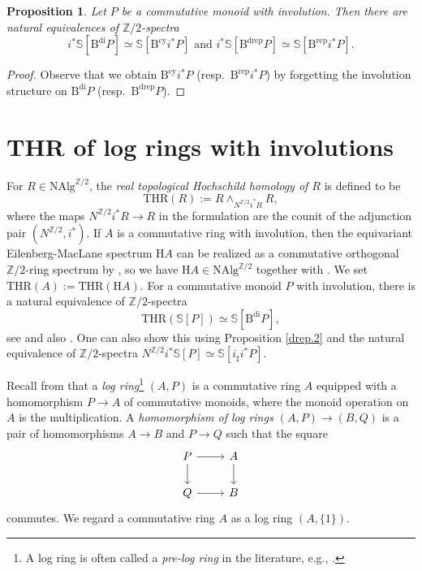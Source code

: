 \documentclass[10pt]{amsart}
\newtheorem{prop}[thm]{Proposition}
\theoremstyle{definition}
\theoremstyle{remark}
\numberwithin{equation}{section}
\newcommand{\Sphere}{\mathbb{S}}
\newcommand{\Z}{\mathbb{Z}}
\newcommand{\NAlg}{\mathrm{NAlg}}
\newcommand{\EM}{\mathrm{H}}
\newcommand{\Bcy}{\mathrm{B}^\mathrm{cy}}
\newcommand{\Brep}{\mathrm{B}^\mathrm{rep}}
\newcommand{\Bdi}{\mathrm{B}^{\mathrm{di}}}
\newcommand{\Bdrep}{\mathrm{B}^\mathrm{drep}}
\newcommand{\THR}{\mathrm{THR}}
\newcommand{\Ztwo}{{\mathbb{Z}/2}}
\begin{document}
\begin{prop}
\label{drep.3}
Let $P$ be a commutative monoid with involution.
Then there are natural equivalences of $\Ztwo$-spectra
\[
i^*\Sphere[\Bdi P]
\simeq
\Sphere[\Bcy i^*P]
\text{ and }
i^*\Sphere[\Bdrep P]
\simeq
\Sphere[\Brep i^*P].
\]
\end{prop}
\begin{proof}
Observe that we obtain $\Bcy i^*P$ (resp.\ $\Brep i^*P$) by forgetting the involution structure on $\Bdi P$ (resp.\ $\Bdrep P$).
\end{proof}


\section{THR of log rings with involutions}
\label{thrring}




For $R\in \NAlg^{\Ztwo}$,
the \emph{real topological Hochschild homology of $R$} is defined to be
\[
\THR(R)
:=
R\wedge_{N^{\Ztwo}i^*R}R,
\]
where the maps $N^{\Ztwo}i^*R \to R$ in the formulation are the counit of the adjunction pair $(N^{\Ztwo},i^*)$.
If $A$ is a commutative ring with involution,
then
the equivariant Eilenberg-MacLane spectrum $\EM A$ can be realized as a commutative orthogonal $\Z/2$-ring spectrum by \cite[Example 11.12]{Schwede},
so we have $\EM A\in \NAlg^{\Z/2}$ together with \cite[Remark A.2.3]{THR}.
We set $\THR(A):=\THR(\EM A)$.
For a commutative monoid $P$ with involution,
there is a natural equivalence of $\Ztwo$-spectra
\begin{equation}
\THR(\Sphere[P])
\simeq
\Sphere[\Bdi P],
\end{equation}
see \cite{Hog} and also  \cite[Proposition 5.9]{DMPR21}.
One can also show this using Proposition \ref{drep.2} and the natural equivalence of $\Ztwo$-spectra $N^{\Ztwo} i^*\Sphere[P]\simeq \Sphere[i_\sharp i^*P]$.

Recall from \cite[Definition III.1.2.3]{Ogu} that a \emph{log ring}\footnote{A log ring is often called a \emph{pre-log ring} in the literature, e.g.,  \cite[Definition 2.1]{Rog09}.}  $(A,P)$ is a commutative ring $A$ equipped with a homomorphism $P\to A$ of commutative monoids,
where the monoid operation on $A$ is the multiplication.
A \emph{homomorphism of log rings $(A,P)\to (B,Q)$} is a pair of homomorphisms $A\to B$ and $P\to Q$ such that the square
\[
\begin{tikzcd}
P\ar[d]\ar[r]&
A\ar[d]
\\
Q\ar[r]&
B
\end{tikzcd}
\]
commutes.
We regard a commutative ring $A$ as a log ring $(A,\{1\})$.
\end{document}

